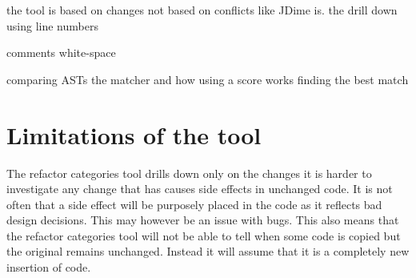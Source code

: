 the tool is based on changes not based on conflicts like JDime is.
the drill down using line numbers


comments
white-space

comparing ASTs
the matcher and how using a score works
finding the best match


% 

\section{Limitations of the tool}
The refactor categories tool drills down only on the changes it is harder to investigate any change that has causes side effects in unchanged code.  It is not often that a side effect will be purposely placed in the code as it reflects bad design decisions.  This may however be an issue with bugs.  This also means that the refactor categories tool will not be able to tell when some code is copied but the original remains unchanged. Instead it will assume that it is a completely new insertion of code.
